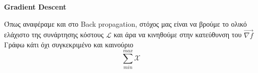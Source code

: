 \documentclass[a4paper,12pt]{article}
\begin{document}



\newpage
\section*{}
\begin{center}
    \Large \textbf{Gradient Descent}
\end{center}

Όπως αναφέραμε και στο Back propagation, στόχος μας είναι να βρούμε το ολικό ελάχιστο της συνάρτησης κόστους  $\mathcal{L}$ και άρα να κινηθούμε στην κατεύθυνση του $\overrightarrow{\nabla f}$
Γράφω κάτι όχι συγκεκριμένο και καινούριο $$\sum_{min}^{max} \mathcal{X}$$
\end{document}
